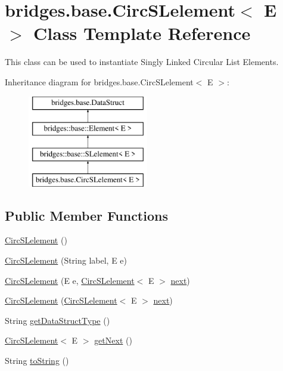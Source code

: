 \hypertarget{classbridges_1_1base_1_1_circ_s_lelement}{}\section{bridges.\+base.\+Circ\+S\+Lelement$<$ E $>$ Class Template Reference}
\label{classbridges_1_1base_1_1_circ_s_lelement}


This class can be used to instantiate Singly Linked Circular List Elements.  


Inheritance diagram for bridges.\+base.\+Circ\+S\+Lelement$<$ E $>$\+:\begin{figure}[H]
\begin{center}
\leavevmode
\includegraphics[height=4.000000cm]{classbridges_1_1base_1_1_circ_s_lelement}
\end{center}
\end{figure}
\subsection*{Public Member Functions}
\begin{DoxyCompactItemize}
\item 
\mbox{\hyperlink{classbridges_1_1base_1_1_circ_s_lelement_a4a5a58cc7a0ec5170a828861c11df1b3}{Circ\+S\+Lelement}} ()
\item 
\mbox{\hyperlink{classbridges_1_1base_1_1_circ_s_lelement_a213d61713e51295d756669def911f080}{Circ\+S\+Lelement}} (String label, E e)
\item 
\mbox{\hyperlink{classbridges_1_1base_1_1_circ_s_lelement_ada65c593c8af7e6ed96fcdf12c26824f}{Circ\+S\+Lelement}} (E e, \mbox{\hyperlink{classbridges_1_1base_1_1_circ_s_lelement}{Circ\+S\+Lelement}}$<$ E $>$ \mbox{\hyperlink{classbridges_1_1base_1_1_s_lelement_abf61c96a74ad319d561c6952ea388e0e}{next}})
\item 
\mbox{\hyperlink{classbridges_1_1base_1_1_circ_s_lelement_ab9e5b98e8d917760b9651a52785358b9}{Circ\+S\+Lelement}} (\mbox{\hyperlink{classbridges_1_1base_1_1_circ_s_lelement}{Circ\+S\+Lelement}}$<$ E $>$ \mbox{\hyperlink{classbridges_1_1base_1_1_s_lelement_abf61c96a74ad319d561c6952ea388e0e}{next}})
\item 
String \mbox{\hyperlink{classbridges_1_1base_1_1_circ_s_lelement_ad56acddc52e8e0b6869a6f24f1e0a90e}{get\+Data\+Struct\+Type}} ()
\item 
\mbox{\hyperlink{classbridges_1_1base_1_1_circ_s_lelement}{Circ\+S\+Lelement}}$<$ E $>$ \mbox{\hyperlink{classbridges_1_1base_1_1_circ_s_lelement_ae18b07e3f1d37b5eca0cae22efc0d395}{get\+Next}} ()
\item 
String \mbox{\hyperlink{classbridges_1_1base_1_1_circ_s_lelement_af307188926766e73efb988f102ce9740}{to\+String}} ()
\end{DoxyCompactItemize}
